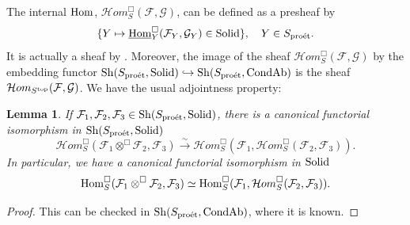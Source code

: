 \documentclass[10pt]{amsart}
\let\cal\mathcal
\newtheorem{lemma}[equation]{Lemma}
\theoremstyle{definition}
\theoremstyle{remark}
\newcommand{\proeet}{\operatorname{pro\acute{e}t} }
\newcommand{\Hom}{{\rm{Hom}} }
\newcommand{\uHom}{\underline{{\rm{Hom}} }}
\newcommand{\Hhom}{{\cal Hom}}
\newcommand{\sff}{{\mathcal{F}}}
\newcommand{\sg}{{\mathcal{G}}}
\numberwithin{equation}{section}
\numberwithin{equation}{section}
\begin{document}
The internal $\Hom$, $\Hhom^{\Box}_{S}(\sff,\sg)$, can be defined as a presheaf by 
$$
\{Y\mapsto  \uHom^{\Box}_{Y}(\sff_Y,\sg_Y)\in {\rm Solid}\},\quad Y\in S_{\proeet}.
$$
It is actually a sheaf by \cite[Prop. 2.2.14]{Schn}.  Moreover, the image of the sheaf $\Hhom^{\Box}_{S}(\sff,\sg)$ by the embedding functor 
${\rm Sh}(S_{\proeet},{\rm Solid})\hookrightarrow  {\rm Sh}(S_{\proeet},{\rm CondAb})$ is the sheaf $\Hhom_{S^{\rm top}}(\sff,\sg)$.
We have the usual adjointness property:
\begin{lemma}\label{adj1}If $\sff_1,\sff_2,\sff_3\in {\rm Sh}(S_{\proeet},{\rm Solid})$, there is a canonical functorial isomorphism in ${\rm Sh}(S_{\proeet},{\rm Solid})$
$$
\Hhom^{\Box}_{S}(\sff_1\otimes^{\Box}\sff_2,\sff_3)\stackrel{\sim}{\to} \Hhom^{\Box}_{S}(\sff_1,\Hhom^{\Box}_{S}(\sff_2,\sff_3)).
$$
In particular, we have a canonical functorial isomorphism in ${\rm Solid}$
$$
\Hom^{\Box}_{S}(\sff_1\otimes^{\Box}\sff_2,\sff_3)\simeq \Hom^{\Box}_{S}(\sff_1,\Hhom^{\Box}_{S}(\sff_2,\sff_3)).
$$
\end{lemma}
\begin{proof}
This can be checked in $ {\rm Sh}(S_{\proeet},{\rm CondAb})$, where it is known. 
 \end{proof}
\end{document}
